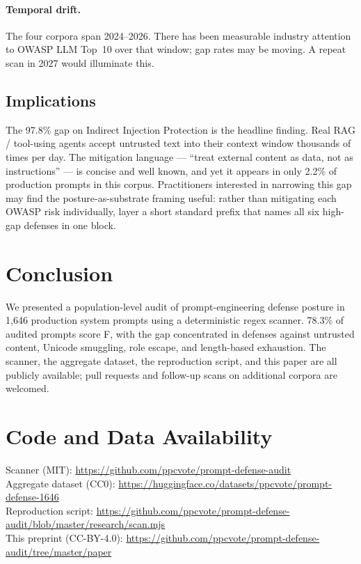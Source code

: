 \documentclass[10pt,letterpaper]{article}
\begin{document}
\paragraph{Temporal drift.} The four corpora span 2024--2026. There
has been measurable industry attention to OWASP LLM Top~10 over that
window; gap rates may be moving. A repeat scan in 2027 would
illuminate this.

\subsection{Implications}
The 97.8\% gap on Indirect Injection Protection is the headline
finding. Real RAG / tool-using agents accept untrusted text into
their context window thousands of times per day. The mitigation
language --- ``treat external content as data, not as instructions'' ---
is concise and well known, and yet it appears in only 2.2\% of
production prompts in this corpus. Practitioners interested in
narrowing this gap may find the
posture-as-substrate framing useful: rather than mitigating each
OWASP risk individually, layer a short standard prefix that names
all six high-gap defenses in one block.

\section{Conclusion}
We presented a population-level audit of prompt-engineering defense
posture in 1{,}646 production system prompts using a deterministic
regex scanner. 78.3\% of audited prompts score F, with the gap
concentrated in defenses against untrusted content, Unicode
smuggling, role escape, and length-based exhaustion. The scanner,
the aggregate dataset, the reproduction script, and this paper are
all publicly available; pull requests and follow-up scans on
additional corpora are welcomed.

\section*{Code and Data Availability}
Scanner (MIT): \url{https://github.com/ppcvote/prompt-defense-audit}\\
Aggregate dataset (CC0): \url{https://huggingface.co/datasets/ppcvote/prompt-defense-1646}\\
Reproduction script:
\url{https://github.com/ppcvote/prompt-defense-audit/blob/master/research/scan.mjs}\\
This preprint (CC-BY-4.0):
\url{https://github.com/ppcvote/prompt-defense-audit/tree/master/paper}
\end{document}
